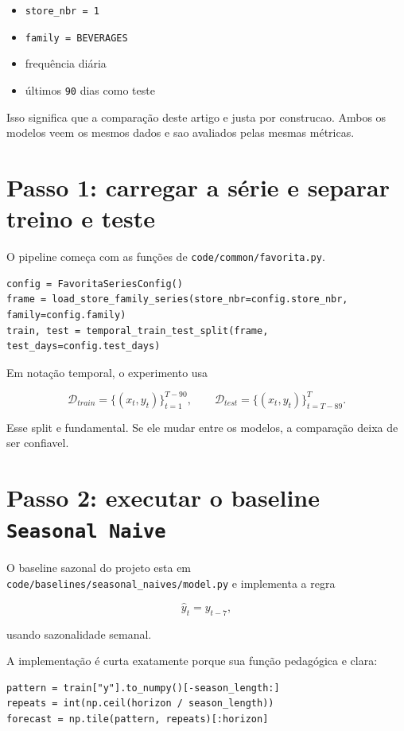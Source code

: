 \documentclass[12pt]{article}
\providecommand{\tightlist}{%
          \setlength{\itemsep}{0pt}\setlength{\parskip}{0pt}}
\begin{document}
\begin{itemize}
\tightlist
\item
  \texttt{store\_nbr\ =\ 1}
\item
  \texttt{family\ =\ BEVERAGES}
\item
  frequência diária
\item
  últimos \texttt{90} dias como teste
\end{itemize}

Isso significa que a comparação deste artigo e justa por construcao. Ambos os modelos veem os mesmos dados e sao avaliados pelas mesmas métricas.

\section{Passo 1: carregar a série e separar treino e teste}\label{3-passo-1-carregar-a-suxe9rie-e-separar-treino-e-teste}

O pipeline começa com as funções de \texttt{code/common/favorita.py}.

\begin{verbatim}
config = FavoritaSeriesConfig()
frame = load_store_family_series(store_nbr=config.store_nbr, family=config.family)
train, test = temporal_train_test_split(frame, test_days=config.test_days)
\end{verbatim}

Em notação temporal, o experimento usa

\[
\mathcal{D}_{train} = \{(x_t, y_t)\}_{t=1}^{T-90},
\qquad
\mathcal{D}_{test} = \{(x_t, y_t)\}_{t=T-89}^T.
\]

Esse split e fundamental. Se ele mudar entre os modelos, a comparação deixa de ser confiavel.

\section{\texorpdfstring{Passo 2: executar o baseline \texttt{Seasonal\ Naive}}{Passo 2: executar o baseline Seasonal Naive}}\label{4-passo-2-executar-o-baseline-seasonal-naive}

O baseline sazonal do projeto esta em \texttt{code/baselines/seasonal\_naives/model.py} e implementa a regra

\[
\hat{y}_t = y_{t-7},
\]

usando sazonalidade semanal.

A implementação é curta exatamente porque sua função pedagógica e clara:

\begin{verbatim}
pattern = train["y"].to_numpy()[-season_length:]
repeats = int(np.ceil(horizon / season_length))
forecast = np.tile(pattern, repeats)[:horizon]
\end{verbatim}
\end{document}
